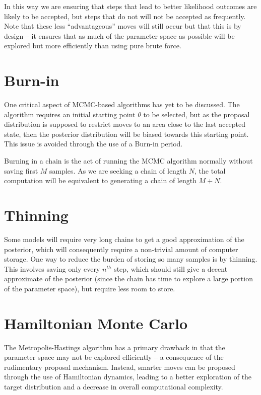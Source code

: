 \documentclass[12pt]{article}
\begin{document}
    In this way we are ensuring that steps that lead to better likelihood outcomes are likely to be accepted, but steps that do not will not be accepted as frequently. Note that these less ``advantageous'' moves will still occur but that this is by design -- it ensures that as much of the parameter space as possible will be explored but more efficiently than using pure brute force.

\section{Burn-in}

    One critical aspect of MCMC-based algorithms has yet to be discussed. The algorithm requires an initial starting point $\theta$ to be selected, but as the proposal distribution is supposed to restrict moves to an area close to the last accepted state, then the posterior distribution will be biased towards this starting point. This issue is avoided through the use of a Burn-in period.

    Burning in a chain is the act of running the MCMC algorithm normally without saving first $M$ samples. As we are seeking a chain of length $N$, the total computation will be equivalent to generating a chain of length $M+N$.

\section{Thinning}

    Some models will require very long chains to get a good approximation of the posterior, which will consequently require a non-trivial amount of computer storage. One way to reduce the burden of storing so many samples is by thinning. This involves saving only every $n^{th}$ step, which should still give a decent approximate of the posterior (since the chain has time to explore a large portion of the parameter space), but require less room to store.

\section{Hamiltonian Monte Carlo}

    The Metropolis-Hastings algorithm has a primary drawback in that the parameter space may not be explored efficiently -- a consequence of the rudimentary proposal mechanism. Instead, smarter moves can be proposed through the use of Hamiltonian dynamics, leading to a better exploration of the target distribution and a decrease in overall computational complexity.
\end{document}
